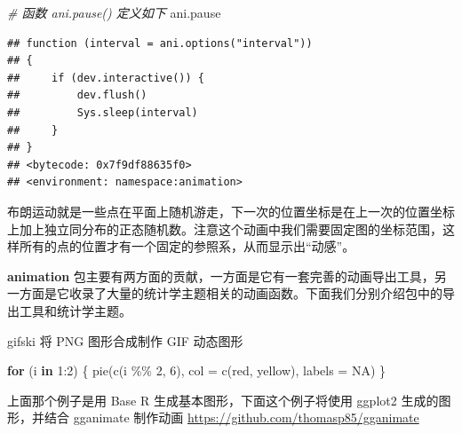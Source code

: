 \documentclass[
  b5paper,
  UTF8,twoside]{book}
\newenvironment{Shaded}{\begin{snugshade}}{\end{snugshade}}
\newcommand{\AttributeTok}[1]{\textcolor[rgb]{0.77,0.63,0.00}{#1}}
\newcommand{\CommentTok}[1]{\textcolor[rgb]{0.56,0.35,0.01}{\textit{#1}}}
\newcommand{\ConstantTok}[1]{\textcolor[rgb]{0.00,0.00,0.00}{#1}}
\newcommand{\ControlFlowTok}[1]{\textcolor[rgb]{0.13,0.29,0.53}{\textbf{#1}}}
\newcommand{\DecValTok}[1]{\textcolor[rgb]{0.00,0.00,0.81}{#1}}
\newcommand{\FunctionTok}[1]{\textcolor[rgb]{0.00,0.00,0.00}{#1}}
\newcommand{\NormalTok}[1]{#1}
\newcommand{\SpecialCharTok}[1]{\textcolor[rgb]{0.00,0.00,0.00}{#1}}
\newcommand{\StringTok}[1]{\textcolor[rgb]{0.31,0.60,0.02}{#1}}
\begin{document}
\begin{Shaded}
\begin{Highlighting}[]
\CommentTok{\# 函数 ani.pause() 定义如下}
\NormalTok{ani.pause}
\end{Highlighting}
\end{Shaded}

\begin{verbatim}
## function (interval = ani.options("interval")) 
## {
##     if (dev.interactive()) {
##         dev.flush()
##         Sys.sleep(interval)
##     }
## }
## <bytecode: 0x7f9df88635f0>
## <environment: namespace:animation>
\end{verbatim}

布朗运动就是一些点在平面上随机游走，下一次的位置坐标是在上一次的位置坐标上加上独立同分布的正态随机数。注意这个动画中我们需要固定图的坐标范围，这样所有的点的位置才有一个固定的参照系，从而显示出``动感''。

\textbf{animation} 包主要有两方面的贡献，一方面是它有一套完善的动画导出工具，另一方面是它收录了大量的统计学主题相关的动画函数。下面我们分别介绍包中的导出工具和统计学主题。

gifski 将 PNG 图形合成制作 GIF 动态图形

\begin{Shaded}
\begin{Highlighting}[]
\ControlFlowTok{for}\NormalTok{ (i }\ControlFlowTok{in} \DecValTok{1}\SpecialCharTok{:}\DecValTok{2}\NormalTok{) \{}
  \FunctionTok{pie}\NormalTok{(}\FunctionTok{c}\NormalTok{(i }\SpecialCharTok{\%\%} \DecValTok{2}\NormalTok{, }\DecValTok{6}\NormalTok{), }\AttributeTok{col =} \FunctionTok{c}\NormalTok{(}\StringTok{\textquotesingle{}red\textquotesingle{}}\NormalTok{, }\StringTok{\textquotesingle{}yellow\textquotesingle{}}\NormalTok{), }\AttributeTok{labels =} \ConstantTok{NA}\NormalTok{)}
\NormalTok{\}}
\end{Highlighting}
\end{Shaded}

\begin{center}\end{center}

上面那个例子是用 Base R 生成基本图形，下面这个例子将使用 ggplot2 生成的图形，并结合 gganimate 制作动画 \url{https://github.com/thomasp85/gganimate}
\end{document}
